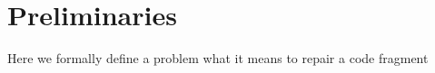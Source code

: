 \section{Preliminaries}
\label{sec:preliminaries}

Here we formally define a problem what it means to repair a code fragment